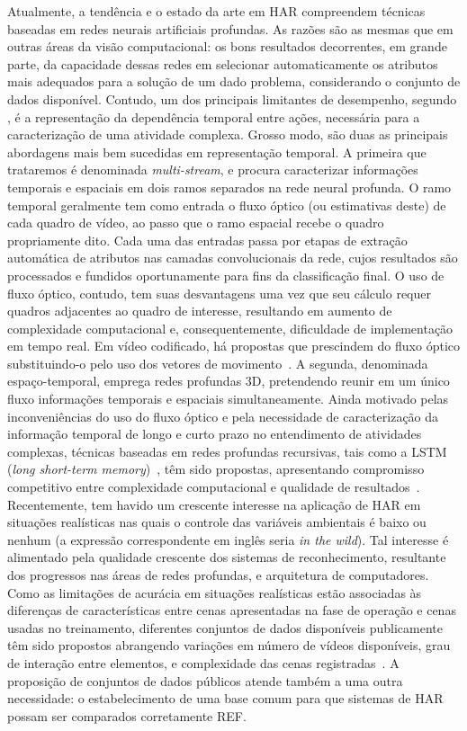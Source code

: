 Atualmente, a tendência e o estado da arte em HAR compreendem técnicas baseadas em redes neurais artificiais profundas. As razões são as mesmas que em outras áreas da visão computacional: os bons resultados decorrentes, em grande parte, da capacidade dessas redes em selecionar automaticamente os atributos mais adequados para a solução de um dado problema, considerando o conjunto de dados disponível. Contudo, um dos principais limitantes de desempenho, segundo \textcite{yao-2019}, é a representação da dependência temporal entre ações, necessária para a caracterização de uma atividade complexa. 
Grosso modo, são duas as principais abordagens mais bem sucedidas em representação temporal. A primeira que trataremos é denominada \emph{multi-stream}, e procura caracterizar informações temporais e espaciais em dois ramos separados na rede neural profunda. O ramo temporal geralmente tem como entrada o fluxo óptico (ou estimativas deste) de cada quadro de vídeo, ao passo que o ramo espacial recebe o quadro propriamente dito. Cada uma das entradas passa por etapas de extração automática de atributos nas camadas convolucionais da rede, cujos resultados são processados e fundidos oportunamente para fins da classificação final. O uso de fluxo óptico, contudo, tem suas desvantagens uma vez que seu cálculo requer quadros adjacentes ao quadro de interesse, resultando em aumento de complexidade computacional e, consequentemente, dificuldade de implementação em tempo real. Em vídeo codificado, há propostas que prescindem do fluxo óptico substituindo-o pelo uso dos vetores de movimento~\parencite{yao-2019}. A segunda, denominada espaço-temporal, emprega redes profundas 3D, pretendendo reunir em um único fluxo informações temporais e espaciais simultaneamente. Ainda motivado pelas inconveniências do uso do fluxo óptico e pela necessidade de caracterização da informação temporal de longo e curto prazo no entendimento de atividades complexas, técnicas baseadas em redes profundas recursivas, tais como a LSTM (\emph{long short-term memory})~\parencite{hochreiter-1997}, têm sido propostas, apresentando compromisso competitivo entre complexidade computacional e qualidade de resultados~\parencite{donahue-2016, herath-2017, xia-2020}.
Recentemente, tem havido um crescente interesse na aplicação de HAR em situações realísticas nas quais o controle das variáveis ambientais é baixo ou nenhum (a expressão correspondente em inglês seria \emph{in the wild}). Tal interesse é alimentado pela qualidade crescente dos sistemas de reconhecimento, resultante dos progressos nas áreas de redes profundas, e arquitetura de computadores. Como as limitações de acurácia em situações realísticas estão associadas às diferenças de características entre cenas apresentadas na fase de operação e cenas usadas no treinamento, diferentes conjuntos de dados disponíveis publicamente têm sido propostos abrangendo variações em número de vídeos disponíveis, grau de interação entre elementos, e complexidade das cenas registradas~\parencite{jegham-2020, kongr-2018}. A proposição de conjuntos de dados públicos atende também a uma outra necessidade: o estabelecimento de uma base comum para que sistemas de HAR possam ser comparados corretamente REF.
